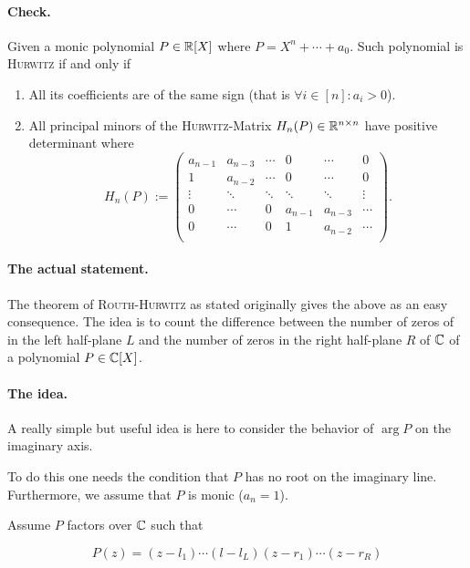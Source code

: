 \documentclass[10pt,a4paper]{article}
\begin{document}
\paragraph{Check.} Given a monic polynomial $P\in\mathbb{R}[X]$ where $P=X^n+\cdots+a_0$. Such polynomial is \textsc{Hurwitz} if and only if 
\begin{enumerate}
\item All its coefficients are of the same sign (that is $\forall i\in[n] : a_i>0$).
\item All principal minors of the \textsc{Hurwitz}-Matrix $H_n(P)\in\mathbb{R}^{n\times n}$ have positive determinant where
\begin{equation}
H_n(P) := \begin{pmatrix}
a_{n-1} & a_{n-3} & \cdots & 0 & \cdots & 0\\
1 		 & a_{n-2} & \cdots & 0 & \cdots & 0\\
\vdots & \ddots & \ddots & \ddots & \ddots & \vdots\\
0 & \cdots & 0 & a_{n-1} & a_{n-3} & \cdots\\
0 & \cdots & 0 & 1 		 & a_{n-2} & \cdots\\
\end{pmatrix}\text{.}
\end{equation}
\end{enumerate}

\paragraph{The actual statement.} The theorem of \textsc{Routh-Hurwitz} as stated originally gives the above as an easy consequence. The idea is to count the difference between the number of zeros of in the left half-plane $L$ and the number of zeros in the right half-plane $R$ of $\mathbb{C}$ of a polynomial $P\in\mathbb{C}[X]$. 

\paragraph{The idea.}
A really simple but useful idea is here to consider the behavior of $\arg{P}$ on the imaginary axis.

To do this one needs the condition that $P$ has no root on the imaginary line. Furthermore, we assume that $P$ is monic ($a_n=1$).

Assume $P$ factors over $\mathbb{C}$ such that 

\begin{equation}
P(z)=(z-l_1)\cdots(l-l_L)(z-r_1)\cdots(z-r_R)
\end{equation}
\end{document}
